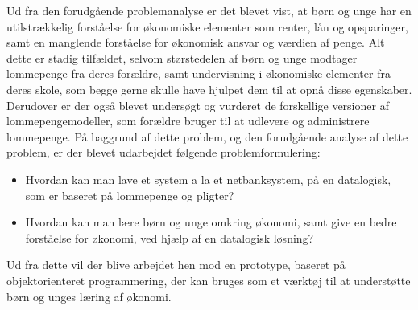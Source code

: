 Ud fra den forudgående problemanalyse er det blevet vist, at børn og unge har en utilstrækkelig forståelse for økonomiske elementer som renter, lån og opsparinger, samt en manglende forståelse for økonomisk ansvar og værdien af penge. Alt dette er stadig tilfældet, selvom størstedelen af børn og unge modtager lommepenge fra deres forældre, samt undervisning i økonomiske elementer fra deres skole, som begge gerne skulle have hjulpet dem til at opnå disse egenskaber. Derudover er der også blevet undersøgt og vurderet de forskellige versioner af lommepengemodeller, som forældre bruger til at udlevere og administrere lommepenge. På baggrund af dette problem, og den forudgående analyse af dette problem, er der blevet udarbejdet følgende problemformulering:

\begin{itemize}
	\item Hvordan kan man lave et system a la et netbanksystem, på en datalogisk, som er baseret på lommepenge og pligter?
	\item Hvordan kan man lære børn og unge omkring økonomi, samt give en bedre forståelse for økonomi, ved hjælp af en datalogisk løsning?
\end{itemize}

Ud fra dette vil der blive arbejdet hen mod en prototype, baseret på objektorienteret programmering, der kan bruges som et værktøj til at understøtte børn og unges læring af økonomi.